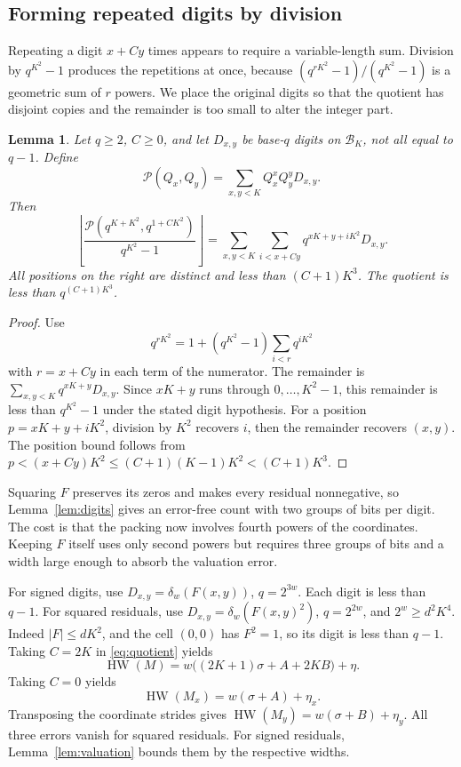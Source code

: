 \documentclass[11pt]{article}
\newtheorem{lemma}[theorem]{Lemma}
\theoremstyle{remark}
\newcommand{\fl}[1]{\left\lfloor #1\right\rfloor}
\newcommand{\HW}{\operatorname{HW}}
\begin{document}
\subsection{Forming repeated digits by division}

Repeating a digit $x+Cy$ times appears to require a variable-length sum.
Division by $q^{K^2}-1$ produces the repetitions at once, because
$(q^{rK^2}-1)/(q^{K^2}-1)$ is a geometric sum of $r$ powers.
We place the original digits so that the quotient has disjoint copies
and the remainder is too small to alter the integer part.

\begin{lemma}\label{lem:quotient}
Let $q\ge2$, $C\ge0$, and let $D_{x,y}$ be base-$q$ digits on
$\mathcal B_K$, not all equal to $q-1$. Define
\[
  \mathcal P(Q_x,Q_y)=\sum_{x,y<K}Q_x^xQ_y^yD_{x,y}.
\]
Then
\begin{equation}\label{eq:quotient}
  \fl{\frac{\mathcal P(q^{K+K^2},q^{1+CK^2})}{q^{K^2}-1}}
  =\sum_{x,y<K}\sum_{i<x+Cy}q^{xK+y+iK^2}D_{x,y}.
\end{equation}
All positions on the right are distinct and less than $(C+1)K^3$.
The quotient is less than $q^{(C+1)K^3}$.
\end{lemma}

\begin{proof}
Use
\[
  q^{rK^2}=1+(q^{K^2}-1)\sum_{i<r}q^{iK^2}
\]
with $r=x+Cy$ in each term of the numerator.
The remainder is $\sum_{x,y<K}q^{xK+y}D_{x,y}$.
Since $xK+y$ runs through $0,\ldots,K^2-1$, this remainder is
less than $q^{K^2}-1$ under the stated digit hypothesis.
For a position $p=xK+y+iK^2$, division by $K^2$ recovers $i$,
then the remainder recovers $(x,y)$. The position bound follows from
$p<(x+Cy)K^2\le(C+1)(K-1)K^2<(C+1)K^3$.
\end{proof}

Squaring $F$ preserves its zeros and makes every residual nonnegative,
so Lemma~\ref{lem:digits} gives an error-free count with two groups of
bits per digit. The cost is that the packing now involves fourth powers
of the coordinates. Keeping $F$ itself uses only second powers but
requires three groups of bits and a width large enough to absorb the
valuation error.

For signed digits, use $D_{x,y}=\delta_w(F(x,y))$, $q=2^{3w}$.
Each digit is less than $q-1$.
For squared residuals, use $D_{x,y}=\delta_w(F(x,y)^2)$,
$q=2^{2w}$, and $2^w\ge d^2K^4$.
Indeed $|F|\le dK^2$, and the cell $(0,0)$ has $F^2=1$, so its
digit is less than $q-1$.
Taking $C=2K$ in \eqref{eq:quotient} yields
\begin{equation}\label{eq:combined-count}
  \HW(M)=w\bigl((2K+1)\sigma+A+2KB\bigr)+\eta.
\end{equation}
Taking $C=0$ yields
\begin{equation}\label{eq:one-count}
  \HW(M_x)=w(\sigma+A)+\eta_x.
\end{equation}
Transposing the coordinate strides gives
$\HW(M_y)=w(\sigma+B)+\eta_y$.
All three errors vanish for squared residuals. For signed residuals,
Lemma~\ref{lem:valuation} bounds them by the respective widths.
\end{document}
